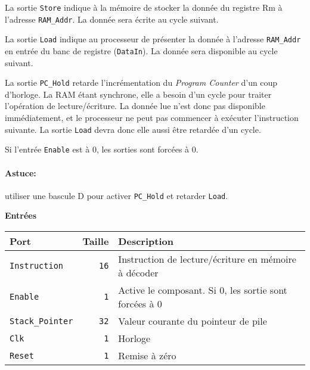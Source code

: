 \documentclass{article}
\begin{document}
    La sortie \texttt{Store} indique à la mémoire de stocker la donnée du registre Rm à l'adresse \texttt{RAM\_Addr}.
    La donnée sera écrite au cycle suivant.

    La sortie \texttt{Load} indique au processeur de présenter la donnée à l'adresse \texttt{RAM\_Addr} en entrée du banc de registre (\texttt{DataIn}).
    La donnée sera disponible au cycle suivant.

    La sortie \texttt{PC\_Hold} retarde l'incrémentation du \textit{Program Counter} d'un coup d'horloge.
    La RAM étant synchrone, elle a besoin d'un cycle pour traiter l'opération de lecture/écriture.
    La donnée lue n'est donc pas disponible immédiatement, et le processeur ne peut pas commencer à exécuter l'instruction suivante.
    La sortie \texttt{Load} devra donc elle aussi être retardée d'un cycle.

    Si l'entrée \texttt{Enable} est à 0, les sorties sont forcées à 0.

    \paragraph{Astuce:} utiliser une bascule D pour activer \texttt{PC\_Hold} et retarder \texttt{Load}.


    \textbf{Entrées}\\

    \begin{tabular}{|l|r|l|}
        \hline
        \textbf{Port}          & \textbf{Taille} & \textbf{Description}                                   \\
        \hline

        \texttt{Instruction}    & \texttt{16}     & Instruction de lecture/écriture en mémoire à décoder   \\
        \hline
        \texttt{Enable}        & \texttt{1}      & Active le composant.
        Si 0, les sortie sont forcées à 0 \\
        \hline
        \texttt{Stack\_Pointer} & \texttt{32}     & Valeur courante du pointeur de pile                    \\
        \hline
        \texttt{Clk}           & \texttt{1}      & Horloge                                                \\
        \hline
        \texttt{Reset}         & \texttt{1}      & Remise à zéro                                          \\


        \hline
    \end{tabular}
\end{document}
